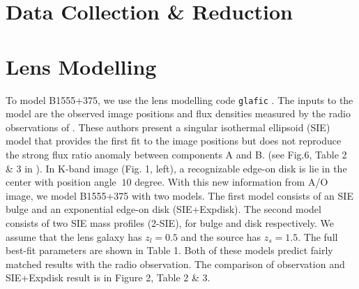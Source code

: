 \documentclass[manuscript]{emulateapj}
\begin{document}
\section{Data Collection \& Reduction}

\section{Lens Modelling}
To model B1555+375, we use the lens modelling code {\tt glafic}
\citep{Oguri}.  The inputs to the model are the observed image positions
and flux densities measured by the radio observations of \citet{Marlow}.
These authors present a singular isothermal ellipsoid (SIE) model that
provides the first fit to the image positions but
does not reproduce the strong flux ratio anomaly between components A and B.
(see Fig.6, Table 2 \& 3 in \citet{Marlow}). In K-band
image (Fig. 1, left), a recognizable edge-on disk is lie in the center
with position angle $~10$ degree. With this new information from A/O image, we model
B1555+375 with two models. The first model consists of an SIE bulge
and an exponential edge-on disk (SIE+Expdisk). The second model
consists of two SIE mass profiles (2-SIE), for bulge and disk
respectively. We assume that the lens galaxy has $z_{l}=0.5$ and the source has $z_s=1.5$. The full best-fit parameters are shown in Table 1. Both
of these models predict fairly matched results with the radio
observation. The comparison of observation and SIE+Expdisk result is
in Figure 2, Table 2 \& 3.



%
\end{document}
